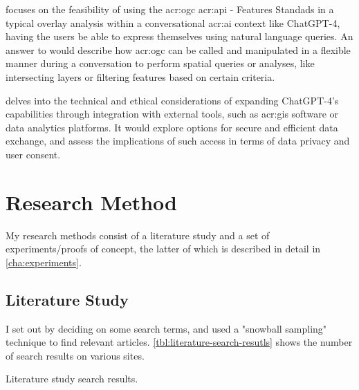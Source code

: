  focuses on the feasibility of using the \acrshort{acr:ogc} \acrshort{acr:api} - Features Standads in a typical overlay analysis within a conversational \acrshort{acr:ai} context like ChatGPT-4, having the users be able to express themselves using natural language queries. An answer to  would describe how \acrshort{acr:ogc}  can be called and manipulated in a flexible manner during a conversation to perform spatial queries or analyses, like intersecting layers or filtering features based on certain criteria.

 delves into the technical and ethical considerations of expanding ChatGPT-4's capabilities through integration with external tools, such as \acrshort{acr:gis} software or data analytics platforms. It would explore options for secure and efficient data exchange, and assess the implications of such access in terms of data privacy and user consent.

\section{Research Method}\label{sec:research-method}

\begin{comment}
What methodology will you apply to address the goals: theoretic/analytic, model/abstraction or design/experiment?
This section will describe the research methodology applied and the reason for this choice of research methodology.
You should return to the actual choices made in the work and the alternatives in the Discussion chapter.
\end{comment}

My research methods consist of a literature study and a set of experiments/proofs of concept, the latter of which is described in detail in \autoref{cha:experiments}.

\subsection{Literature Study}\label{subsec:literature-study}

I set out by deciding on some search terms, and used a "snowball sampling" technique to find relevant articles. \autoref{tbl:literature-search-resutls} shows the number of search results on various sites.

\begin{table}
    \caption{Literature study search results.}
    \label{tbl:literature-search-resutls}
\end{table}

